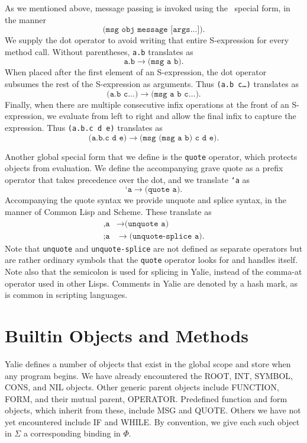 \documentclass[twocolumn]{article}
\begin{document}
As we mentioned above, message passing is invoked using the \msg\
special form, in the manner
\[\texttt{(msg obj message [args...])}.\]
We supply the dot operator to avoid writing that entire
S-expression for every method call. Without parentheses, \texttt{a.b}
translates as
\[\texttt{a.b}\rightarrow\texttt{(msg a b)}.\]
When placed after the first element of an S-expression, the dot
operator subsumes the rest of the S-expression as arguments. Thus
\texttt{(a.b c\ldots)}  translates as
\[\texttt{(a.b c\ldots)} \rightarrow \texttt{(msg a b c\ldots)}.\]
Finally, when there are multiple consecutive infix operations at the
front of an S-expression, we evaluate from left to right and allow the
final infix to capture the expression. Thus \texttt{(a.b.c d e)}
translates as
\[ \texttt{(a.b.c d e)} \rightarrow \texttt{(msg (msg a b) c d e)}.\]

Another global special form that we define is the \texttt{quote}
operator, which protects objects from evaluation. We define the
accompanying grave quote as a prefix operator that takes precedence
over the dot, and we translate \texttt{`a} as
\[ \texttt{`a} \rightarrow \texttt{(quote a)}.\]
Accompanying the quote syntax we provide unquote and splice syntax, in
the manner of Common Lisp and Scheme. These translate as
\begin{align*}
  \texttt{,a} & \rightarrow \texttt{(unquote a)}\\
  \texttt{;a} & \rightarrow \texttt{(unquote-splice a)}.
\end{align*}
Note that \texttt{unquote} and \texttt{unquote-splice} are not defined
as separate operators but are rather ordinary symbols that the
\texttt{quote} operator looks for and handles itself. Note also that
the semicolon is used for splicing in Yalie, instead of the comma-at
operator used in other Lisps. Comments in Yalie are denoted by a hash
mark, as is common in scripting languages.

\section*{Builtin Objects and Methods}

Yalie defines a number of objects that exist in the global scope and
store when any program begins. We have already encountered the
\textsf{ROOT}, \textsf{INT}, \textsf{SYMBOL}, \textsf{CONS}, and
\textsf{NIL} objects. Other generic parent objects include
\textsf{FUNCTION}, \textsf{FORM}, and their mutual parent,
\textsf{OPERATOR}. Predefined function and form objects, which inherit
from these, include \textsf{MSG} and \textsf{QUOTE}. Others we have
not yet encountered include \textsf{IF} and \textsf{WHILE}. By
convention, we give each such object in $\Sigma$ a corresponding
binding in $\Phi$.
\end{document}
